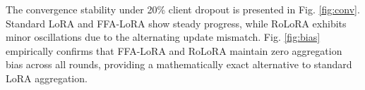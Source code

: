 \documentclass[journal]{IEEEtran}
\begin{document}
The convergence stability under 20\% client dropout is presented in Fig. \ref{fig:conv}. Standard LoRA and FFA-LoRA show steady progress, while RoLoRA exhibits minor oscillations due to the alternating update mismatch. Fig. \ref{fig:bias} empirically confirms that FFA-LoRA and RoLoRA maintain zero aggregation bias across all rounds, providing a mathematically exact alternative to standard LoRA aggregation.






%
%



%
%
\end{document}
